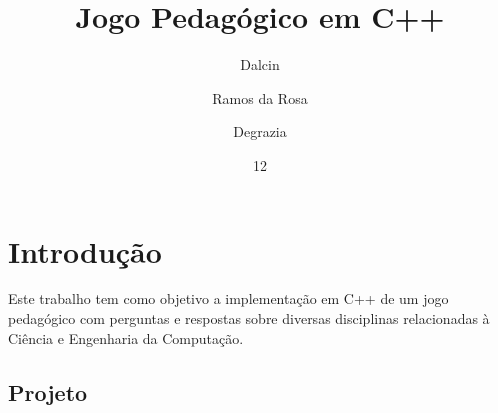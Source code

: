 \documentclass[rel_mlp]{iiufrgs}
\title{Jogo Pedagógico em C++}
\author{Dalcin}{Leonardo} %
\author{Ramos da Rosa}{Paulo Ricardo}
\author{Degrazia}{Pietro}
\date{12}{2018}
\begin{document}
\maketitle      


\tableofcontents








%
\chapter{Introdução} \label{intro}




Este trabalho tem como objetivo a implementação em C++ de um jogo pedagógico com perguntas e respostas sobre diversas disciplinas relacionadas à Ciência e Engenharia da Computação.

\section{Projeto}
\end{document}
